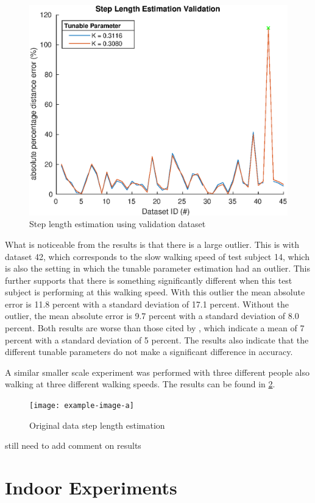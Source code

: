 \begin{figure}[H]
	\centering
	\includegraphics[width=0.6\linewidth]{images/20201028_1344_Step_Length_Estimation_Validation}
	\caption{Step length estimation using validation dataset}
	\label{fig:step_length_estimation_validation}
\end{figure}

What is noticeable from the results is that there is a large outlier. This is with dataset 42, which corresponds to the slow walking speed of test subject 14, which is also the setting in which the tunable parameter estimation had an outlier. This further supports that there is something significantly different when this test subject is performing at this walking speed. With this outlier the mean absolute error is 11.8 percent with a standard deviation of 17.1 percent. Without the outlier, the mean absolute error is 9.7 percent with a standard deviation of 8.0 percent. Both results are worse than those cited by \cite{Vezocnik2019}, which indicate a mean of 7 percent with a standard deviation of 5 percent.
The results also indicate that the different tunable parameters do not make a significant difference in accuracy. \par 
A similar smaller scale experiment was performed with three different people also walking at three different walking speeds. The results can be found in \cref{fig:step_length_personal_testing}. 
\begin{figure}[H]
	\centering
	\texttt{[image: example-image-a]}
	\caption{Original data step length estimation}
	\label{fig:step_length_personal_testing}
\end{figure}

{\color{red} still need to add comment on results }

\newpage

\section{Indoor Experiments}

